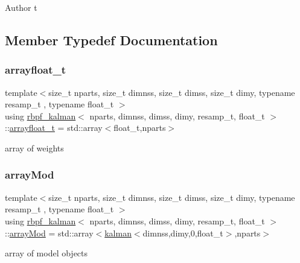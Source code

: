 \begin{DoxyAuthor}{Author}
t 
\end{DoxyAuthor}


\subsection{Member Typedef Documentation}
\mbox{\label{classrbpf__kalman_a77493b35e7848d5bd91904701adabbbc}} 
\subsubsection{\texorpdfstring{arrayfloat\+\_\+t}{arrayfloat\_t}}
{\footnotesize\ttfamily template$<$size\+\_\+t nparts, size\+\_\+t dimnss, size\+\_\+t dimss, size\+\_\+t dimy, typename resamp\+\_\+t , typename float\+\_\+t $>$ \\
using \hyperlink{classrbpf__kalman}{rbpf\+\_\+kalman}$<$ nparts, dimnss, dimss, dimy, resamp\+\_\+t, float\+\_\+t $>$\+::\hyperlink{classrbpf__kalman_a77493b35e7848d5bd91904701adabbbc}{arrayfloat\+\_\+t} =  std\+::array$<$float\+\_\+t,nparts$>$}

array of weights \mbox{\label{classrbpf__kalman_a99e5cb365f01f83962440f29357744d9}} 
\subsubsection{\texorpdfstring{array\+Mod}{arrayMod}}
{\footnotesize\ttfamily template$<$size\+\_\+t nparts, size\+\_\+t dimnss, size\+\_\+t dimss, size\+\_\+t dimy, typename resamp\+\_\+t , typename float\+\_\+t $>$ \\
using \hyperlink{classrbpf__kalman}{rbpf\+\_\+kalman}$<$ nparts, dimnss, dimss, dimy, resamp\+\_\+t, float\+\_\+t $>$\+::\hyperlink{classrbpf__kalman_a99e5cb365f01f83962440f29357744d9}{array\+Mod} =  std\+::array$<$\hyperlink{classkalman}{kalman}$<$dimnss,dimy,0,float\+\_\+t$>$,nparts$>$}

array of model objects \mbox{\label{classrbpf__kalman_ad0c2ef4db6363157244741517daae136}} 
